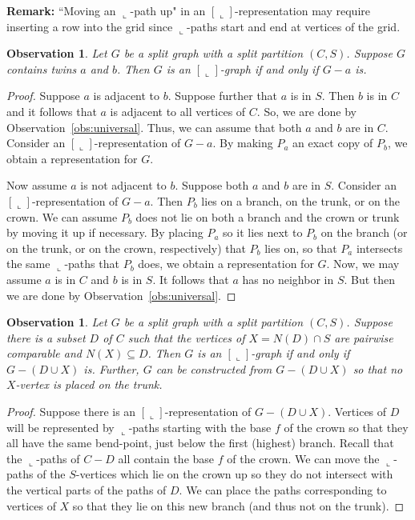\documentclass[11pt,3p,times]{elsarticle}
\newenvironment{myproof}{\begin{proof}}{\end{proof}}
\newcommand{\La}{\ensuremath{\llcorner}} \newcommand{\Lb}{\ensuremath{\ulcorner}} \newcommand{\Lc}{\ensuremath{\lrcorner}} \newcommand{\Ld}{\ensuremath{\urcorner}}
\newtheorem{observation}[theorem]{Observation}
\begin{document}
\noindent \textbf{Remark:} ``Moving an $\La$-path up" in an $[\La]$-representation
may require inserting a row into the grid since $\La$-paths start and end
at vertices of the grid.
\begin{observation}\label{obs:twin}
Let $G$ be a split graph  with a split partition $(C,S)$.
Suppose $G$ contains  twins $a$ and $b$. Then $G$ is an $[\La]$-graph
if and only if $G-a$ is. 
\end{observation}
\begin{myproof}
Suppose $a$ is adjacent to $b$. Suppose further that $a$ is in $S$.  Then $b$
is in $C$ and it follows that $a$ is adjacent to all vertices of
$C$. So, we are done by Observation~\ref{obs:universal}. Thus,
we can assume that  both $a$ and $b$ are in $C$. Consider an $[\La]$-representation of
$G-a$. By making $P_a$ an exact copy of $P_b$, we obtain a
representation for $G$.

Now assume $a$ is not adjacent to  $b$. Suppose both $a$
and $b$ are in $S$. Consider an $[\La]$-representation of $G-a$.
Then $P_b$ lies on a branch, on the trunk, or on the crown.
We can assume $P_b$ does not lie on both a branch and the crown or trunk
by moving it up if necessary.  By placing $P_a$
so it lies next to $P_b$ on the branch (or on the trunk, or on the crown, respectively)
that $P_b$ lies on, so that $P_a$ intersects the same $\La$-paths that $P_b$ does,
we obtain a representation for $G$.
Now, we may assume $a$ is in $C$ and $b$ is in
$S$. It follows that $a$ has no neighbor in $S$. But then we are
done by Observation~\ref{obs:universal}.
\end{myproof}
\begin{observation}\label{obs:threshold}
Let $G$ be a split graph  with a split partition $(C,S)$.
Suppose there is a subset $D$ of $C$ such that the vertices of
$X=N(D) \cap S$ are pairwise comparable and $N(X) \subseteq D$.
Then $G$ is an $[\La]$-graph if and only if $G-(D \cup X)$ is.
Further, $G$ can be constructed from $G-(D \cup X)$ so that no $X$-vertex
is placed on the trunk.
\end{observation}
\begin{myproof}
Suppose
there is an $[\La]$-representation of $G-(D \cup X)$. Vertices of
$D$ will be represented by $\La$-paths starting with the base $f$
of the crown so that they all have the same bend-point,
just below the first (highest) branch.
Recall that the $\La$-paths of $C-D$ all contain the base $f$ of the crown.
We can move the $\La$-paths of the $S$-vertices which lie on the crown up so they
do not intersect with the vertical parts of the paths of $D$. We can place the
paths corresponding to vertices  of $X$ so that they lie on this new branch (and
thus not on the trunk).
\end{myproof}
\end{document}
